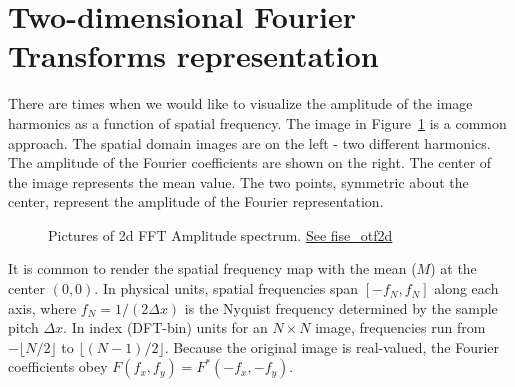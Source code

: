\documentclass[
  letterpaper,
]{book}
\begin{document}
\section{Two-dimensional Fourier Transforms
representation}\label{two-dimensional-fourier-transforms-representation}

There are times when we would like to visualize the amplitude of the
image harmonics as a function of spatial frequency. The image in
Figure~\ref{fig-optics-otf2d} is a common approach. The spatial domain
images are on the left - two different harmonics. The amplitude of the
Fourier coefficients are shown on the right. The center of the image
represents the mean value. The two points, symmetric about the center,
represent the amplitude of the Fourier representation.

\begin{figure}


\caption{\label{fig-optics-otf2d}Pictures of 2d FFT Amplitude spectrum.
\href{../code/02Optics/fise_otf2d.html}{See fise\_otf2d}}

\end{figure}%

It is common to render the spatial frequency map with the mean (\(M\))
at the center \((0,0)\). In physical units, spatial frequencies span
\([-f_N, f_N]\) along each axis, where \(f_N = 1/(2\Delta x)\) is the
Nyquist frequency determined by the sample pitch \(\Delta x\). In index
(DFT-bin) units for an \(N\times N\) image, frequencies run from
\(-\lfloor N/2\rfloor\) to \(\lfloor (N-1)/2\rfloor\). Because the
original image is real-valued, the Fourier coefficients obey
\(F(f_x,f_y)=F^*(-f_x,-f_y)\).
\end{document}
